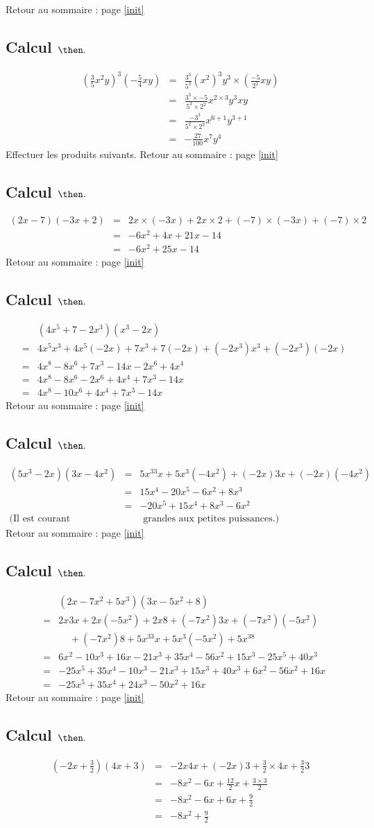 \documentclass[14pt]{article}
\theoremstyle{remark}
\newcounter{n}
\renewcommand{\it}{Retour au sommaire : page \ref{init}
	\subsection{Calcul $ \mathbf{ \then}.$}\label{\then} \stepcounter{n} }
\theoremstyle{plain}
\begin{document}
\it \begin{eqnarray*}\left(\frac35x^2y\right)^3\left(-\frac54xy\right)&=& 
\frac{3^3}{5^3}\left(x^2\right)^3y^3\times\left(\frac{-5}{2^2}xy\right)
\\
&=& \frac{3^3\times -5}{5^3\times2^2}x^{2\times3}y^3xy\\
&=& \frac{-3^3}{5^2\times2^2}x^{6+1}y^{3+1}\\
&=&- \frac{27}{100} x^7y^4\end{eqnarray*} 
Effectuer les produits suivants. 
\it \begin{eqnarray*}(2x-7)(-3x+2)&=& 
2x\times(-3x)+2x\times2+(-7)\times(-3x)+(-7)\times2\\
&=& -6x^2+4x+21x-14\\
&=& -6x^2 + 25x-14\end{eqnarray*}
\it \begin{eqnarray*}&&(4x^5+7-2x^3)(x^3-2x)\\&=& 
4x^5 x^3+4x^5(-2x)
+7 x^3+7(-2x)+(-2x^3) x^3+(-2x^3)(-2x)\\
&=& 4x^8-8x^6+7x^3-14x-2x^6+4x^4\\
&=&4x^8-8x^6-2x^6+4x^4+7x^3-14x\\
&=&4x^8-10x^6+4x^4+7x^3-14x
\end{eqnarray*}
\it \begin{eqnarray*}(5x^3-2x)(3x-4x^2)
&=& 5x^33x+5x^3(-4x^2)+(-2x)3x+(-2x)(-4x^2)\\
&=& 15x^4-20x^5-6x^2+8x^3\\
&=& -20x^5 + 15x^4 +8x^3 -6x^2\\
\text{(Il est courant d'ordonner des}&&\text{ grandes aux petites puissances.)}\end{eqnarray*}
\it \begin{eqnarray*}&&(2x-7x^2+5x^3)(3x-5x^2+8)\\
&=& 2x3x+2x(-5x^2)+2x8+(-7x^2)3x+(-7x^2)(-5x^2)\\&& \ \ \ \ \ +(-7x^2)8+5x^33x+5x^3(-5x^2)+5x^38\\
&=& 6x^2-10x^3+16x
-21x^3+35x^4-56x^2+15x^3-25x^5+40x^3\\
&=& -25x^5 +35x^4-10x^3-21x^3+15x^3+40x^3+6x^2-56x^2+16x\\
&=& -25x^5+35x^4+24x^3-50x^2+16x
\end{eqnarray*}
\it \begin{eqnarray*}\left(-2x+\frac32\right)(4x+3)&=& 
-2x4x+(-2x)3+\frac32\times4x+\frac323\\
&=& -8x^2-6x+\frac{12}2x+\frac{3\times3}2\\
&=& -8x^2-6x+6x+\frac92\\
&=& -8x^2+\frac92\end{eqnarray*}
\end{document}
